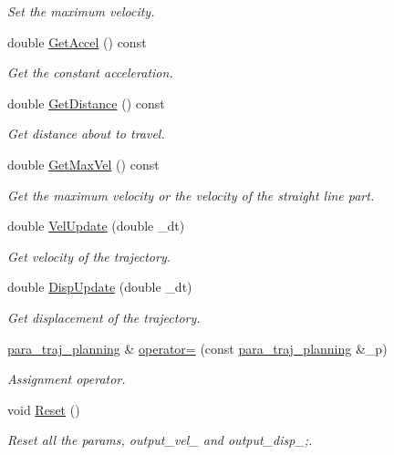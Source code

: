 \begin{DoxyCompactItemize}
\begin{DoxyCompactList}\small\item\em Set the maximum velocity. \end{DoxyCompactList}\item 
double \hyperlink{classnubot_1_1para__traj__planning_aec43c0428c311568c6369d02e12795e8}{Get\-Accel} () const 
\begin{DoxyCompactList}\small\item\em Get the constant acceleration. \end{DoxyCompactList}\item 
double \hyperlink{classnubot_1_1para__traj__planning_adca3092bc6cfe64f2b7fb09dd66c50c9}{Get\-Distance} () const 
\begin{DoxyCompactList}\small\item\em Get distance about to travel. \end{DoxyCompactList}\item 
double \hyperlink{classnubot_1_1para__traj__planning_a8c5b225529f70ba36617a81b38f2da61}{Get\-Max\-Vel} () const 
\begin{DoxyCompactList}\small\item\em Get the maximum velocity or the velocity of the straight line part. \end{DoxyCompactList}\item 
double \hyperlink{classnubot_1_1para__traj__planning_a444ae4938bb69327f99d293fb08b3d4d}{Vel\-Update} (double \-\_\-dt)
\begin{DoxyCompactList}\small\item\em Get velocity of the trajectory. \end{DoxyCompactList}\item 
double \hyperlink{classnubot_1_1para__traj__planning_ae67aeaf943c7db5c12b18ec4d915247b}{Disp\-Update} (double \-\_\-dt)
\begin{DoxyCompactList}\small\item\em Get displacement of the trajectory. \end{DoxyCompactList}\item 
\hyperlink{classnubot_1_1para__traj__planning}{para\-\_\-traj\-\_\-planning} \& \hyperlink{classnubot_1_1para__traj__planning_a8b1a8820091ff8bb12801171ef10d9f2}{operator=} (const \hyperlink{classnubot_1_1para__traj__planning}{para\-\_\-traj\-\_\-planning} \&\-\_\-p)
\begin{DoxyCompactList}\small\item\em Assignment operator. \end{DoxyCompactList}\item 
void \hyperlink{classnubot_1_1para__traj__planning_aeb7b8fa44365f9b6e81a24214d2556a4}{Reset} ()
\begin{DoxyCompactList}\small\item\em Reset all the params, output\-\_\-vel\-\_\- and output\-\_\-disp\-\_\-;. \end{DoxyCompactList}\end{DoxyCompactItemize}
